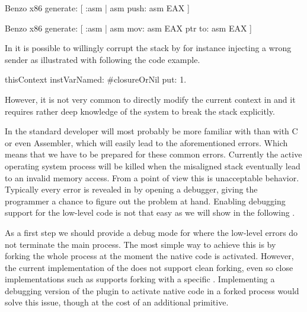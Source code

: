 \begin{stcode}[caption={Simple \B code possibly leading to an unbalanced stack.}]{}
Benzo x86 generate: [ :asm |
	asm push: asm EAX ]
\end{stcode}

\begin{stcode}[caption={\B code possibly leading memory access violation.}]{}
Benzo x86 generate: [ :asm |
	asm mov: asm EAX ptr to: asm EAX ]
\end{stcode}

\noindent In \PH it is possible to willingly corrupt the stack by for instance injecting a wrong sender as illustrated with following the code example.
%
\begin{stcode}[label=lst:benzo-pharo-stack-corruption]{}
thisContext instVarNamed: #closureOrNil put: 1.
\end{stcode}
%
However, it is not very common to directly modify the current context in \PH and it requires rather deep knowledge of the system to break the stack explicitly.

In \B the standard developer will most probably be more familiar with \PH than with C or even Assembler, which will easily lead to the aforementioned errors.
Which means that we have to be prepared for these common errors.
Currently the active operating system process will be killed when the misaligned stack eventually lead to an invalid memory access.
From a \PH point of view this is unacceptable behavior.
Typically every error is revealed in \PH by opening a debugger, giving the programmer a chance to figure out the problem at hand.
Enabling debugging support for the low-level \B code is not that easy as we will show in the following .

As a first step we should provide a debug mode for \B where the low-level errors do not terminate the main process.
The most simple way to achieve this is by forking the whole \VM process at the moment the native \B code is activated.
However, the current implementation of the \PH \VM does not support clean forking, even so close implementations such as \Squeak supports forking with a specific .
Implementing a debugging version of the \B plugin to activate native code in a forked process would solve this issue, though at the cost of an additional primitive.

